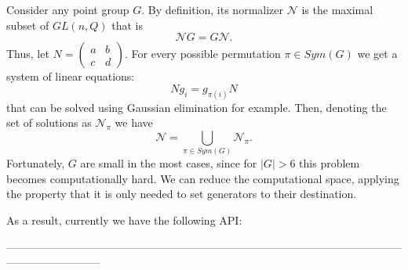 \documentclass[a4paper,12pt]{amsart}
\theoremstyle{definition}
\begin{document}
	Consider any point group $G$. By definition, its normalizer $\mathcal{N}$ is the maximal subset of $GL(n, Q)$ that is 
	$$
	\mathcal{N}G = G\mathcal{N}.
	$$
	Thus, let $N = \begin{pmatrix}a & b \\ c & d \end{pmatrix}$. For every possible permutation $\pi \in Sym(G)$ we get a system of linear equations: 
	\begin{equation} \label{eq:eq2}
		Ng_i = g_{\pi(i)}N
	\end{equation}
	that can be solved using Gaussian elimination for example. Then, denoting the set of solutions as $\mathcal{N}_\pi$ we have
	$$
	\mathcal{N} = \bigcup_{\pi \in Sym(G)}\mathcal{N}_\pi.
	$$
	Fortunately, $G$ are small in the most cases, since for $|G| > 6$ this problem becomes computationally hard. We can reduce the computational space, applying the property that it is only needed to set generators to their destination. 
	
	As a result, currently we have the following API: 
	
	--------------------------------------------------------------------------------------------------------------------------------------
	
\end{document}
